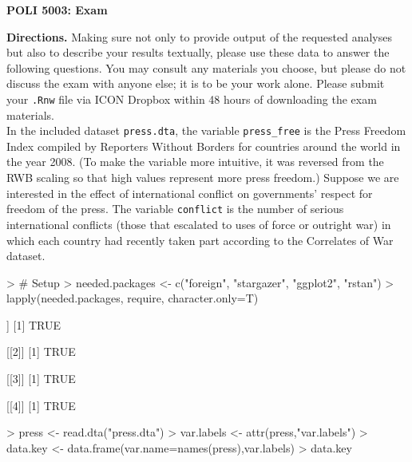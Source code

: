 \documentclass[12pt]{article}
\begin{document}


\pagestyle{empty}

\begin{center}
{\Large \textbf{POLI 5003: Exam}}
\end{center}

\textbf{Directions.}  Making sure not only to provide output of the requested analyses but also to describe your results textually, please use these data to answer the following questions.  You may consult any materials you choose, but please do not discuss the exam with anyone else; it is to be your work alone.  Please submit your \verb+.Rnw+ file via ICON Dropbox within 48 hours of downloading the exam materials.\\

In the included dataset \verb+press.dta+, the variable \verb+press_free+ is the Press Freedom Index compiled by Reporters Without Borders for countries around the world in the year 2008.  (To make the variable more intuitive, it was reversed from the RWB scaling so that high values represent more press freedom.)  Suppose we are interested in the effect of international conflict on governments' respect for freedom of the press.  The variable \texttt{conflict} is the number of serious international conflicts (those that escalated to uses of force or outright war) in which each country had recently taken part according to the Correlates of War dataset.  


\begin{Schunk}
\begin{Sinput}
> # Setup
> needed.packages <- c("foreign", "stargazer", "ggplot2", "rstan")
> lapply(needed.packages, require, character.only=T)
\end{Sinput}
\begin{Soutput}
[[1]]
[1] TRUE

[[2]]
[1] TRUE

[[3]]
[1] TRUE

[[4]]
[1] TRUE
\end{Soutput}
\begin{Sinput}
> press <- read.dta("press.dta")
> var.labels <- attr(press,"var.labels")
> data.key <- data.frame(var.name=names(press),var.labels)
> data.key
\end{Sinput}
\end{Schunk}
\end{document}
